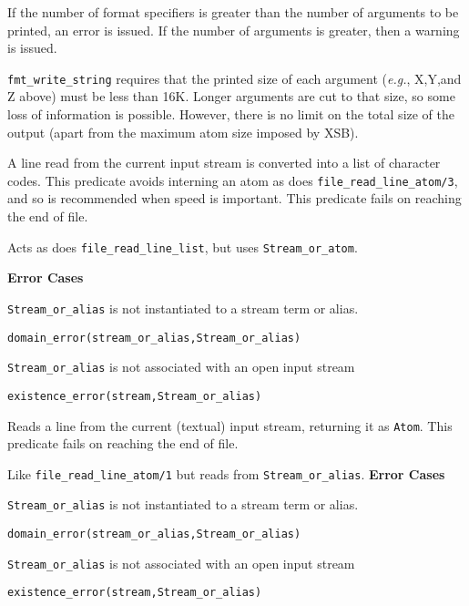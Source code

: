\begin{description}
    If the number of format specifiers is greater than the number of
    arguments to be printed, an error is issued. If the number of arguments
    is greater, then a warning is issued.

    {\tt fmt\_write\_string} requires that the printed size of each
    argument ({\it e.g.}, X,Y,and Z above) must be less than 16K. Longer
    arguments are cut to that size, so some loss of information is possible.
    However, there is no limit on the total size of the output (apart from
    the maximum atom size imposed by XSB).

A line read from the current input stream is converted into a list of
character codes.  This predicate 
avoids interning an atom as does {\tt file\_read\_line\_atom/3}, and so is
recommended when speed is important.  This predicate fails on reaching
the end of file.

Acts as does {\tt file\_read\_line\_list}, but uses {\tt Stream\_or\_atom}.

{\bf Error Cases} 
\bi
\item 	{\tt Stream\_or\_alias} is not instantiated to a stream term
or alias.
\bi
\item 	{\tt domain\_error(stream\_or\_alias,Stream\_or\_alias)}
\ei
\item 	{\tt Stream\_or\_alias} is not associated with an open input stream
\bi
\item 	{\tt existence\_error(stream,Stream\_or\_alias)}
\ei
\ei

%
Reads a line from the current (textual) input stream, returning it as
{\tt Atom}.  This predicate fails on reaching the end of file.

Like {\tt file\_read\_line\_atom/1} but reads from {\tt Stream\_or\_alias}.
%
{\bf Error Cases} 
\bi
\item 	{\tt Stream\_or\_alias} is not instantiated to a stream term
or alias.
\bi
\item 	{\tt domain\_error(stream\_or\_alias,Stream\_or\_alias)}
\ei
\item 	{\tt Stream\_or\_alias} is not associated with an open input stream
\bi
\item 	{\tt existence\_error(stream,Stream\_or\_alias)}
\ei
\ei


\end{description}
